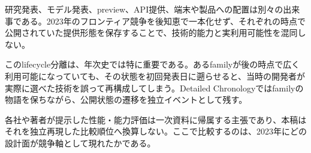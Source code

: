 研究発表、モデル発表、preview、API提供、端末や製品への配置は別々の出来事である。2023年のフロンティア競争を後知恵で一本化せず、それぞれの時点で公開されていた提供形態を保存することで、技術的能力と実利用可能性を混同しない。\autocite{src-013fa77665db,src-3375c5d27d9b,src-39071a9443e5,src-5bfa9c93d034,src-93d355bf8806,src-a3dead6cff65,src-a95452783369,src-b1525886b462,src-db671ee1d1b8,src-e116708067ab,src-f5041642fb21,src-f951bda6a0f4,src-fd9cb9c0061f}


このlifecycle分離は、年次史では特に重要である。あるfamilyが後の時点で広く利用可能になっていても、その状態を初回発表日に遡らせると、当時の開発者が実際に選べた技術を誤って再構成してしまう。Detailed Chronologyではfamilyの物語を保ちながら、公開状態の遷移を独立イベントとして残す。\autocite{src-013fa77665db,src-3375c5d27d9b,src-39071a9443e5,src-5bfa9c93d034,src-93d355bf8806,src-a3dead6cff65,src-a95452783369,src-b1525886b462,src-db671ee1d1b8,src-f5041642fb21,src-f951bda6a0f4,src-fd9cb9c0061f}


\begin{claimboundary}
各社や著者が提示した性能・能力評価は一次資料に帰属する主張であり、本稿はそれを独立再現した比較順位へ換算しない。ここで比較するのは、2023年にどの設計面が競争軸として現れたかである。\autocite{src-3375c5d27d9b,src-5bfa9c93d034,src-a95452783369,src-f951bda6a0f4}
\end{claimboundary}
